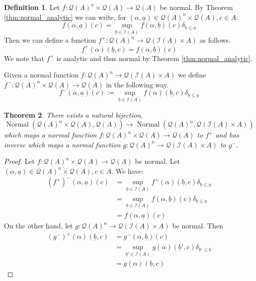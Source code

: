 \documentclass[12pt]{article}
\theoremstyle{plain}
\newtheorem{thm}{Theorem}[subsection] %
\theoremstyle{definition}
\newtheorem{defn}[thm]{Definition} %
\newcommand{\call}[1]{\mathcal{#1}}
\newcommand{\Ical}{\call{I}}
\newcommand{\Qcal}{\call{Q}}
\newcommand{\lto}{\longrightarrow}
\begin{document}
	\begin{defn}
		Let $f: \Qcal(A)^{n} \times \Qcal(A) \lto \Qcal(A)$ be normal. By Theorem \ref{thm:normal_analytic} we can write, for $(\alpha, \underline{a}) \in \Qcal(A)^{n} \times \Qcal(A), c \in A$:
		\begin{equation}\label{eq:variables}
			f(\alpha, \underline{a})(c) = \operatorname{sup}_{\underline{b} \in \Ical(A)}f(\alpha, \underline{b})(c)\delta_{\underline{b} \leq \underline{a}}
		\end{equation}
		Then we can define a function $f^+: \Qcal(A)^{n} \lto \Qcal(\Ical(A) \times A)$ as follows.
		\begin{equation}
			f^+(\alpha)(\underline{b}, c) = f(\alpha, \underline{b})(c)
		\end{equation}
		We note that $f^+$ is analytic and thus normal by Theorem \ref{thm:normal_analytic}.
		
		Given a normal function $f: \Qcal(A)^n \lto \Qcal(\Ical(A) \times A)$ we define $f^-: \Qcal(A)^{n} \times \Qcal(A) \lto \Qcal(A)$ in the following way.
		\begin{equation}
			f^-(\alpha, \underline{a})(c) := \operatorname{sup}_{\underline{b} \in \Ical(A)}f(\alpha)(\underline{b}, c)\delta_{\underline{b} \leq \underline{a}}
			\end{equation}
		\end{defn}
	
	\begin{thm}\label{thm:adjunction}
		There exists a natural bijection.
		\begin{equation}\label{eq:injective}
			\operatorname{Normal}(\Qcal(A)^{n} \times \Qcal(A), \Qcal(A)) \lto \operatorname{Normal}(\Qcal(A)^n, \Qcal(\Ical(A) \times A))
		\end{equation}
	which maps a normal function $f: \Qcal(A)^{n} \times \Qcal(A) \lto \Qcal(A)$ to $f^+$ and has inverse which maps a normal function $g: \Qcal(A)^n \lto \Qcal(\Ical(A) \times A)$ to $g^-$.
		\end{thm}
	\begin{proof}
	Let $f: \Qcal(A)^{n} \times \Qcal(A) \lto \Qcal(A)$ be normal. Let $(\alpha, \underline{a}) \in \Qcal(A)^{n} \times \Qcal(A), c \in A$. We have:
	\begin{align*}
		(f^+)^-(\alpha, \underline{a})(c) &= \operatorname{sup}_{\underline{b} \in \Ical(A)}f^+(\alpha)(\underline{b},c)\delta_{\underline{b} \leq \underline{a}}\\
		&=  \operatorname{sup}_{\underline{b} \in \Ical(A)}f(\alpha, \underline{b})(c)\delta_{\underline{b} \leq \underline{a}}\\
		&=f(\alpha, \underline{a})(c)
	\end{align*}
On the other hand, let $g: \Qcal(A)^n \lto \Qcal(\Ical(A) \times A)$ be normal. Then
\begin{align*}
	(g^-)^+(\alpha)(\underline{b},c) &= g^-(\alpha, \underline{b})(c)\\
	&= \operatorname{sup}_{\underline{b}' \in \Ical(A)}g(\alpha)(\underline{b}', c)\delta_{\underline{b}' \leq \underline{b}}\\
	&= g(\alpha)(\underline{b},c)
	\end{align*}
	\end{proof}
	
\end{document}

